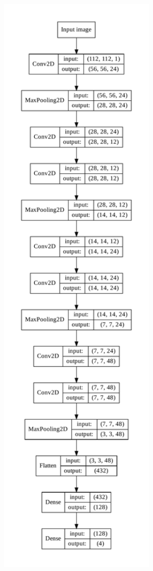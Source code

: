 \documentclass{kththesis}
\begin{document}
\begin{minipage}{.3\linewidth}
  \centering
  \vspace*{-20mm}
  \hspace*{0mm}
  \includegraphics[width=1.8\textwidth]{img/model.pdf}
\end{minipage}
\end{document}

